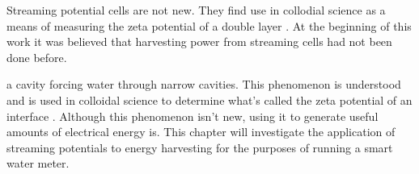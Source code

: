 Streaming potential cells are not new.
They find use in collodial science as a means of measuring the zeta potential of a double layer \cite{Gu2000,Scales1992,Daiguji2004,VanderHeyden2006,Mala1997}.
At the beginning of this work it was believed that harvesting power from streaming cells had not been done before.




a cavity forcing water through narrow cavities. This phenomenon is understood
and is used in colloidal science to determine what's called the zeta potential
of an interface \cite{Gu2000,Scales1992,Daiguji2004,VanderHeyden2006,Mala1997}.
Although this phenomenon isn't new, using it to generate useful amounts of
electrical energy is. This chapter will investigate the application of
streaming potentials to energy harvesting for the purposes of running a smart
water meter.



